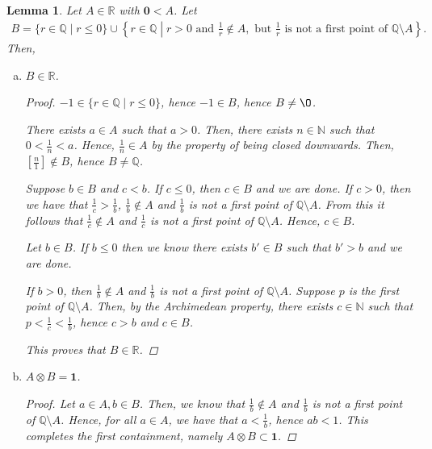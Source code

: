 \documentclass[11pt]{article}
\newcommand{\bbN}{\mathbb{N}}
\newcommand{\bbQ}{\mathbb{Q}}
\newcommand{\bbR}{\mathbb{R}}
\renewcommand{\emptyset}{\O}
\newtheorem{lemma}[theorem]{Lemma}
\theoremstyle{definition}
\numberwithin{equation}{subsection}
\begin{document}
\begin{lemma}
	Let $A\in\bbR$ with $\mathbf{0}<A$. Let
	\begin{align*}
		B = \{r \in \bbQ \mid r \leq 0\} \cup \left\{r \in \bbQ \mathrel{}\middle|\mathrel{} r > 0\text{ and }\frac{1}{r} \notin A, \text{ but } \frac{1}{r} \text{ is not a first point of }\bbQ \setminus A\right\}.
	\end{align*}
	Then,
	\begin{enumerate}[(a)]
		\item $B \in \bbR$.
                
\begin{proof}
$-1\in \{r \in \bbQ \mid r \leq 0\}$, hence $-1\in B$, hence $B \neq \emptyset$.

There exists $a\in A$ such that $a>0$. Then, there exists $n\in \bbN$ such that $0<\frac{1}{n}<a$. Hence, $\frac{1}{n} \in A$ by the property of being closed downwards. Then, $[\frac{n}{1}] \notin B$, hence $B \neq \bbQ$.

Suppose $b \in B$ and $c<b$. If $c \leq 0$, then $c \in B$ and we are done. If $c>0$, then we have that $\frac{1}{c}>\frac{1}{b}$, $\frac{1}{b} \notin A$ and $\frac{1}{b}$ is not a first point of $\bbQ \setminus A$. From this it follows that $\frac{1}{c} \notin A$ and $\frac{1}{c}$ is not a first point of $\bbQ \setminus A$. Hence, $c \in B$.

Let $b \in B$. If $b\leq 0$ then we know there exists $b'\in B$ such that $b'>b$ and we are done. 

If $b>0$, then $\frac{1}{b} \notin A$ and $\frac{1}{b}$ is not a first point of $\bbQ \setminus A$. Suppose $p$ is the first point of $\bbQ \setminus A$. Then, by the Archimedean property, there exists $c \in \bbN$ such that $p<\frac{1}{c}<\frac{1}{b}$, hence $c>b$ and $c\in B$. 

This proves that $B \in \bbR$.



\renewcommand\qedsymbol{QED}
\end{proof}

		\item $A \otimes B = \mathbf{1}$.
	        
\begin{proof}
Let $a\in A, b\in B$. Then, we know that $\frac{1}{b} \notin A$ and $\frac{1}{b}$ is not a first point of $\bbQ \setminus A$. Hence, for all $a\in A$, we have that $a< \frac{1}{b}$, hence $ab<1$. This completes the first containment, namely $A \otimes B \subset \mathbf{1}$.


\end{proof}
\end{enumerate}
\end{lemma}
\end{document}
